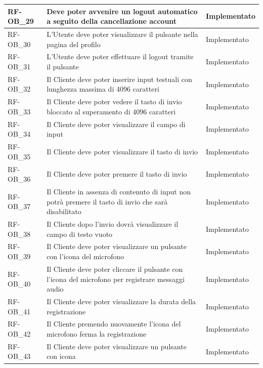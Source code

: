 \begin{longtable}{|>{\raggedright}p{}|>{\raggedright\arraybackslash}p{}|>{\raggedright\arraybackslash}p{}|}
	\hline
	RF-OB\_29 \hypertarget{rf-ob_29} & Deve poter avvenire un logout automatico a seguito della cancellazione account & Implementato \\
	\hline
	RF-OB\_30 \hypertarget{rf-ob_30} & L'Utente deve poter visualizzare il pulsante \vr{Logout} nella pagina del profilo & Implementato \\
	\hline
	RF-OB\_31 \hypertarget{rf-ob_31} & L'Utente deve poter effettuare il logout tramite il pulsante \vr{Logout} & Implementato \\
	\hline
	RF-OB\_32 \hypertarget{rf-ob_32} & Il Cliente deve poter inserire input testuali con lunghezza massima di 4096 caratteri & Implementato \\
	\hline
	RF-OB\_33 \hypertarget{rf-ob_33} & Il Cliente deve poter vedere il tasto di invio bloccato al superamento di 4096 caratteri & Implementato \\
	\hline
	RF-OB\_34 \hypertarget{rf-ob_34} & Il Cliente deve poter visualizzare il campo di input & Implementato \\
	\hline
	RF-OB\_35 \hypertarget{rf-ob_35} & Il Cliente deve poter visualizzare il tasto di invio & Implementato \\
	\hline
	RF-OB\_36 \hypertarget{rf-ob_36} & Il Cliente deve poter premere il tasto di invio & Implementato \\
	\hline
	RF-OB\_37 \hypertarget{rf-ob_37} & Il Cliente in assenza di contenuto di input non potrà premere il tasto di invio che sarà disabilitato & Implementato \\
	\hline
	RF-OB\_38 \hypertarget{rf-ob_38} & Il Cliente dopo l'invio dovrà visualizzare il campo di testo vuoto & Implementato \\
	\hline
	RF-OB\_39 \hypertarget{rf-ob_39} & Il Cliente deve poter visualizzare un pulsante con l'icona del microfono & Implementato \\
	\hline
	RF-OB\_40 \hypertarget{rf-ob_40} & Il Cliente deve poter cliccare il pulsante con l'icona del microfono per registrare messaggi audio & Implementato \\
	\hline
	RF-OB\_41 \hypertarget{rf-ob_41} & Il Cliente deve poter visualizzare la durata della registrazione & Implementato \\
	\hline
	RF-OB\_42 \hypertarget{rf-ob_42} & Il Cliente premendo nuovamente l'icona del microfono ferma la registrazione & Implementato \\
	\hline
	RF-OB\_43 \hypertarget{rf-ob_43} & Il Cliente deve poter visualizzare un pulsante con icona \vr{clip} & Implementato \\

\end{longtable}
